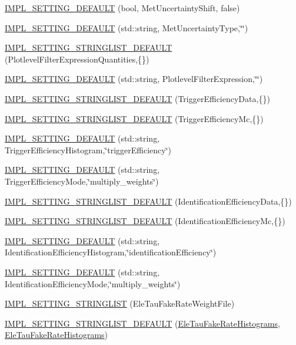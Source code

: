 \begin{DoxyCompactItemize}
\item 
\hyperlink{classHttSettings_a4e846de7937b2f2198769026a9e4231b}{IMPL\_\-SETTING\_\-DEFAULT} (bool, MetUncertaintyShift, false)
\item 
\hyperlink{classHttSettings_a64be19c15dbd362e2c66ad4be1fd46dd}{IMPL\_\-SETTING\_\-DEFAULT} (std::string, MetUncertaintyType,\char`\"{}\char`\"{})
\item 
\hyperlink{classHttSettings_a19b1c2be0f5467f754d6c4c4283ca087}{IMPL\_\-SETTING\_\-STRINGLIST\_\-DEFAULT} (PlotlevelFilterExpressionQuantities,\{\})
\item 
\hyperlink{classHttSettings_acbcc938324675f415c2eb56727fda6cf}{IMPL\_\-SETTING\_\-DEFAULT} (std::string, PlotlevelFilterExpression,\char`\"{}\char`\"{})
\item 
\hyperlink{classHttSettings_a8bff861fd341d793e6f72b573796b592}{IMPL\_\-SETTING\_\-STRINGLIST\_\-DEFAULT} (TriggerEfficiencyData,\{\})
\item 
\hyperlink{classHttSettings_ac488a7041dd0ab6dd4d6898c481bece4}{IMPL\_\-SETTING\_\-STRINGLIST\_\-DEFAULT} (TriggerEfficiencyMc,\{\})
\item 
\hyperlink{classHttSettings_aaacf2d8bb898b43bed3d12c702e7a2b1}{IMPL\_\-SETTING\_\-DEFAULT} (std::string, TriggerEfficiencyHistogram,\char`\"{}triggerEfficiency\char`\"{})
\item 
\hyperlink{classHttSettings_a1574630abf1ab2d0197f91e7296db55f}{IMPL\_\-SETTING\_\-DEFAULT} (std::string, TriggerEfficiencyMode,\char`\"{}multiply\_\-weights\char`\"{})
\item 
\hyperlink{classHttSettings_a2e6b5492e8fb2a12a4acdd8239e8635e}{IMPL\_\-SETTING\_\-STRINGLIST\_\-DEFAULT} (IdentificationEfficiencyData,\{\})
\item 
\hyperlink{classHttSettings_a46e815a98145369bfafc8ce14f6973c8}{IMPL\_\-SETTING\_\-STRINGLIST\_\-DEFAULT} (IdentificationEfficiencyMc,\{\})
\item 
\hyperlink{classHttSettings_adf2bac074503f040e82618fc2345a5fc}{IMPL\_\-SETTING\_\-DEFAULT} (std::string, IdentificationEfficiencyHistogram,\char`\"{}identificationEfficiency\char`\"{})
\item 
\hyperlink{classHttSettings_ab8748bfbd6132d3e7acd14c95bf86fe6}{IMPL\_\-SETTING\_\-DEFAULT} (std::string, IdentificationEfficiencyMode,\char`\"{}multiply\_\-weights\char`\"{})
\item 
\hyperlink{classHttSettings_af061ebad059cc50153cb70089a5687ea}{IMPL\_\-SETTING\_\-STRINGLIST} (EleTauFakeRateWeightFile)
\item 
\hyperlink{classHttSettings_a0de597dd7ea6c06a46a6f03ad93b037d}{IMPL\_\-SETTING\_\-STRINGLIST\_\-DEFAULT} (\hyperlink{classHttSettings_ae13115ebff12caecd683ea97cadecafc}{EleTauFakeRateHistograms}, \hyperlink{classHttSettings_ae13115ebff12caecd683ea97cadecafc}{EleTauFakeRateHistograms})

\end{DoxyCompactItemize}
